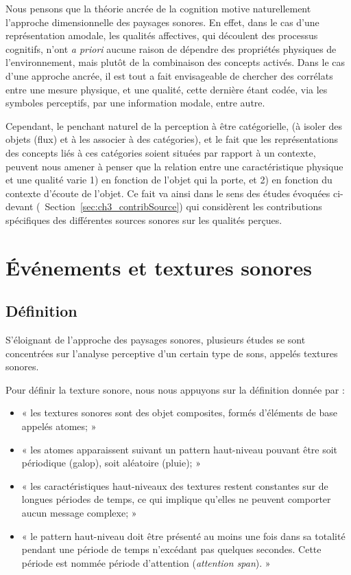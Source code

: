 Nous pensons que la théorie ancrée de la cognition motive naturellement l'approche dimensionnelle des paysages sonores. En effet, dans le cas d'une représentation amodale, les qualités affectives, qui découlent des processus cognitifs, n'ont \emph{a priori} aucune raison de dépendre des propriétés physiques de l'environnement, mais plutôt de la combinaison des concepts activés. Dans le cas d'une approche ancrée, il est tout a fait envisageable de chercher des corrélats entre une mesure physique, et une qualité, cette dernière étant codée, via les symboles perceptifs, par une information modale, entre autre.

Cependant, le penchant naturel de la perception à être catégorielle, (à isoler des objets (flux) et à les associer à des catégories), et le fait que les représentations des concepts liés à ces catégories soient situées par rapport à un contexte, peuvent nous amener à penser que la relation entre une caractéristique physique et une qualité varie 1) en fonction de l'objet qui la porte, et 2) en fonction du contexte d'écoute de l'objet. Ce fait va ainsi dans le sens des études évoquées ci-devant (\cf~Section~\ref{sec:ch3_contribSource}) qui considèrent les contributions spécifiques des différentes sources sonores sur les qualités perçues.


\section{Événements et textures sonores}
\label{sec:ch3_eventTexture}

\subsection{Définition}
\label{sec:ch3_textureDef}

S'éloignant de l'approche des paysages sonores, plusieurs études se sont concentrées sur l'analyse perceptive d'un certain type de sons, appelés textures sonores.

Pour définir la texture sonore, nous nous appuyons sur la définition donnée par \citep[p. 25]{saint1995classification}:  

\begin{itemize}
\item « les textures sonores sont des objet composites, formés d'éléments de base appelés atomes; »
\item « les atomes apparaissent suivant un pattern haut-niveau pouvant être soit périodique (galop), soit aléatoire (pluie); »
\item « les caractéristiques haut-niveaux des textures restent constantes sur de longues périodes de temps, ce qui implique qu'elles ne peuvent comporter aucun message complexe; »
\item « le pattern haut-niveau doit être présenté au moins une fois dans sa totalité pendant une période de temps n’excédant pas quelques secondes. Cette période est nommée période d'attention (\emph{attention span}). »
\end{itemize}

